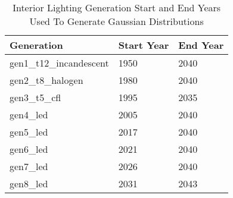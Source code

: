 \begin{table}
\small
\centering
\caption[Interior Lighting Generation Start and End Years]{Interior Lighting Generation Start and End Years Used To Generate Gaussian Distributions}
\label{tab:ltg_gen_year}
\begin{tabular}{|l|l|l|}
\hline
\textbf{Generation}     & \textbf{Start Year} & \textbf{End Year} \\ \hline
gen1\_t12\_incandescent & 1950                & 2040              \\ \hline
gen2\_t8\_halogen       & 1980                & 2040              \\ \hline
gen3\_t5\_cfl           & 1995                & 2035              \\ \hline
gen4\_led               & 2005                & 2040              \\ \hline
gen5\_led               & 2017                & 2040              \\ \hline
gen6\_led               & 2021                & 2040              \\ \hline
gen7\_led               & 2026                & 2040              \\ \hline
gen8\_led               & 2031                & 2043                \\ \hline             
\end{tabular}
\end{table}
